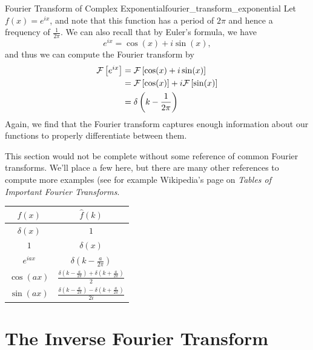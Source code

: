 \begin{ex}{Fourier Transform of Complex Exponential}{fourier_transform_exponential}
	Let $f(x)= e^{ix}$, and note that this function has a period of $2\pi$ and hence a frequency of $\frac{1}{2\pi}$.  We can also recall that by Euler's formula, we have
	\[
	e^{ix} = \cos(x)+i\sin(x),
	\]
	and thus we can compute the Fourier transform by
	\begin{align*}
		\mathcal{F}\left[ e^{ix} \right] &= \mathcal{F}\left[ \cos(x)+i\sin(x) \right]\\
		&= \mathcal{F}\left[ \cos(x) \right]+i\mathcal{F}\left[ \sin(x) \right]\\
		&= \delta\left(k-\frac{1}{2\pi}\right)
	\end{align*}
	Again, we find that the Fourier transform captures enough information about our functions to properly differentiate between them.  
\end{ex}

This section would not be complete without some reference of common Fourier transforms.  We'll place a few here, but there are many other references to compute more examples (see for example Wikipedia's page on \emph{Tables of Important Fourier Transforms}.

\begin{table}[H]
        \centering
        \renewcommand{\arraystretch}{2}
        \begin{tabular}{c|c}
            $f(x)$ & $\hat{f}(k)$\\
            \hline
         	$\delta(x)$ & $1$\\
         	$1$ & $\delta(x)$\\
         	$e^{iax}$ & $\delta\left(k-\frac{a}{2\pi}\right)$\\
         	$\cos(ax)$ & $\frac{\delta\left(k-\frac{a}{2\pi}\right)+\delta\left(k+\frac{a}{2\pi}\right)}{2}$\\
     		$\sin(ax)$ & $\frac{\delta\left(k-\frac{a}{2\pi}\right)-\delta\left(k+\frac{a}{2\pi}\right)}{2i}$
        \end{tabular}
        \label{tab:fourier_transform}
    \end{table}
    
\section{The Inverse Fourier Transform}


